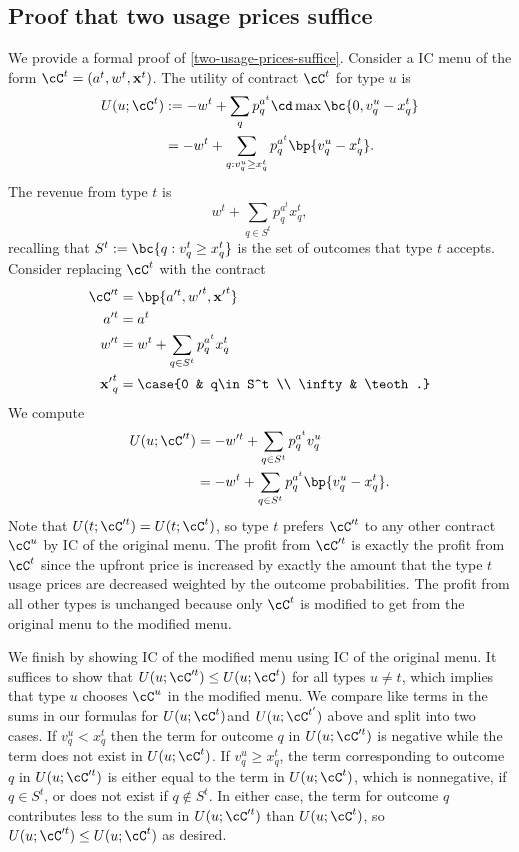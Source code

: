 \subsection{Proof that two usage prices suffice} \label{two-usage-prices-suffice-proof}

We provide a formal proof of \cref{two-usage-prices-suffice}. Consider a IC menu of the form $\cC^t = (a^t, w^t, \mathbf{x}^t)$. The utility of contract $\cC^t$ for type $u$ is
    \begin{align*}
        U(u;\cC^t) &:= -w^t + \sum_{q} p^{a^t}_q \cd \max\bc{0, v^u_q - x^t_q}
        \\&= -w^t + \sum_{q: v^u_q \ge x^t_q} p^{a^t}_q \bp{v^u_q - x^t_q}.
    \end{align*}
    The revenue from type $t$ is
    \[w^t + \sum_{q\in S^t} p^{a^t}_q x^t_q,\] recalling that $S^t := \bc{q: v^t_q \ge x^t_q}$ is the set of outcomes that type $t$ accepts.
    Consider replacing $\cC^t$ with the contract
    \begin{align*}
        \cC'^t &= \bp{a'^t, {w'}^t, \mathbf{x'}^t} \\
        a'^t &= a^t \\
        w'^t &= w^t + \sum_{q\in S^t} p^{a^t}_q x^t_q \\
        \mathbf{x'}^t_q &= \case{0 & q\in S^t \\ \infty & \teoth.}
    \end{align*}
    We compute
    \begin{align*}
        U(u;\cC'^t) &= -w'^t + \sum_{q\in S^t} p^{a^t}_q v^u_q
        \\& = -w^t + \sum_{q\in S^t} p^{a^t}_q \bp{v^u_q - x^t_q}.
    \end{align*}
   Note that $U(t; \cC'^t) = U(t; \cC^t)$, so type $t$ prefers $\cC'^t$ to any other contract $\cC^u$ by IC of the original menu. The profit from $\cC'^t$ is exactly the profit from $\cC^t$ since the upfront price is increased by exactly the amount that the type $t$ usage prices are decreased weighted by the outcome probabilities. The profit from all other types is unchanged because only $\cC^t$ is modified to get from the original menu to the modified menu.
   
   We finish by showing IC of the modified menu using IC of the original menu. It suffices to show that $U(u;\cC'^t) \le U(u; \cC^t)$ for all types $u\neq t$, which implies that type $u$ chooses $\cC^u$ in the modified menu. We compare like terms in the sums in our formulas for $U(u;\cC^t)$and $U(u;\cC^{t'})$ above and split into two cases. If $v^u_q < x^t_q$ then the term for outcome $q$ in $U(u;\cC'^t)$ is negative while the term does not exist in $U(u;\cC^t)$. If $v^u_q \ge x^t_q$, the term corresponding to outcome $q$ in $U(u;\cC'^t)$ is either equal to the term in $U(u;\cC^t)$, which is nonnegative, if $q\in S^t$, or does not exist if $q\notin S^t$. In either case, the term for outcome $q$ contributes less to the sum in $U(u;\cC'^t)$ than $U(u;\cC^t)$, so $U(u;\cC'^t) \le U(u; \cC^t)$ as desired.

